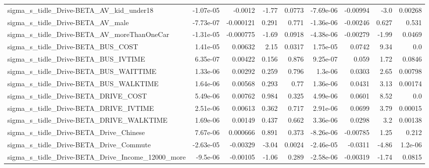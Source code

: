 \begin{tabular}{lrrrrrrrr}
sigma\_s\_tidle\_Drive-BETA\_AV\_kid\_under18            &   -1.07e-05 &      -0.0012 &     -1.77 &   0.0773 &  -7.69e-06 &    -0.00994 &         -3.0 &       0.00268 \\
sigma\_s\_tidle\_Drive-BETA\_AV\_male                   &   -7.73e-07 &    -0.000121 &     0.291 &    0.771 &  -1.36e-06 &    -0.00246 &        0.627 &         0.531 \\
sigma\_s\_tidle\_Drive-BETA\_AV\_moreThanOneCar         &   -1.31e-05 &    -0.000775 &     -1.69 &   0.0918 &  -4.38e-06 &    -0.00279 &        -1.99 &        0.0469 \\
sigma\_s\_tidle\_Drive-BETA\_BUS\_COST                  &    1.41e-05 &      0.00632 &      2.15 &   0.0317 &   1.75e-05 &      0.0742 &         9.34 &           0.0 \\
sigma\_s\_tidle\_Drive-BETA\_BUS\_IVTIME                &    6.35e-07 &      0.00422 &     0.156 &    0.876 &   9.25e-07 &       0.059 &         1.72 &        0.0846 \\
sigma\_s\_tidle\_Drive-BETA\_BUS\_WAITTIME              &    1.33e-06 &      0.00292 &     0.259 &    0.796 &    1.3e-06 &      0.0303 &         2.65 &       0.00798 \\
sigma\_s\_tidle\_Drive-BETA\_BUS\_WALKTIME              &    1.64e-06 &      0.00568 &     0.293 &     0.77 &   1.36e-06 &      0.0431 &         3.13 &       0.00174 \\
sigma\_s\_tidle\_Drive-BETA\_DRIVE\_COST                &    5.49e-06 &      0.00762 &     0.984 &    0.325 &   4.99e-06 &      0.0601 &         8.52 &           0.0 \\
sigma\_s\_tidle\_Drive-BETA\_DRIVE\_IVTIME              &    2.51e-06 &      0.00613 &     0.362 &    0.717 &   2.91e-06 &      0.0699 &         3.79 &       0.00015 \\
sigma\_s\_tidle\_Drive-BETA\_DRIVE\_WALKTIME            &    1.69e-06 &      0.00149 &     0.437 &    0.662 &   3.36e-06 &      0.0298 &          3.2 &       0.00138 \\
sigma\_s\_tidle\_Drive-BETA\_Drive\_Chinese             &    7.67e-06 &     0.000666 &     0.891 &    0.373 &  -8.26e-06 &    -0.00785 &         1.25 &         0.212 \\
sigma\_s\_tidle\_Drive-BETA\_Drive\_Commute             &   -2.63e-05 &     -0.00329 &     -3.04 &   0.0024 &  -2.46e-05 &     -0.0311 &        -4.86 &       1.2e-06 \\
sigma\_s\_tidle\_Drive-BETA\_Drive\_Income\_12000\_more   &    -9.5e-06 &     -0.00105 &     -1.06 &    0.289 &  -2.58e-06 &    -0.00319 &        -1.74 &        0.0815 \\

\end{tabular}
